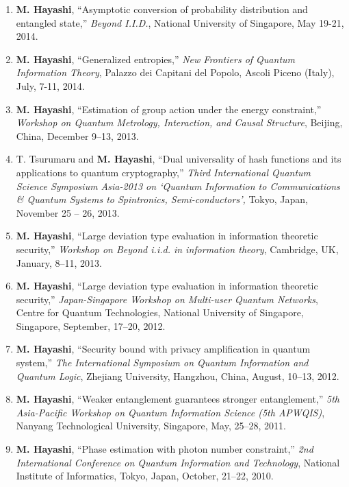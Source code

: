 \documentclass[a4paper,12pt,oneside]{article}
\begin{document}
\begin{enumerate}
\item 
\textbf{M. Hayashi}, 
``Asymptotic conversion of probability distribution and entangled state,'' {\em Beyond I.I.D.}, National University of Singapore, May 19-21, 2014.

\item 
\textbf{M. Hayashi}, 
``Generalized entropies,''
{\em New Frontiers of Quantum Information Theory}, 
Palazzo dei Capitani del Popolo, Ascoli Piceno (Italy),  July, 7-11, 2014.


\item 
\textbf{M. Hayashi}, 
``Estimation of group action under the energy constraint,''
{\em Workshop on Quantum Metrology, Interaction, and Causal Structure},
Beijing, China, December 9--13, 2013. 

\item 
T. Tsurumaru and \textbf{M. Hayashi}, 
``Dual universality of hash functions and its applications to quantum
cryptography,''
{\em Third International Quantum Science Symposium Asia-2013
on `Quantum Information to Communications \& Quantum Systems to Spintronics, Semi-conductors',}
Tokyo, Japan, November 25 -- 26, 2013.

\item 
\textbf{M. Hayashi}, 
``Large deviation type evaluation in information theoretic security,''
{\em Workshop on Beyond i.i.d. in information theory},
Cambridge, UK, January, 8--11, 2013.

\item 
\textbf{M. Hayashi}, 
``Large deviation type evaluation in information theoretic security,'' 
{\em Japan-Singapore Workshop on Multi-user Quantum Networks}, 
Centre for Quantum Technologies, National University of Singapore, Singapore, September, 17--20, 2012.


\item 
\textbf{M. Hayashi}, 
``Security bound with privacy amplification in quantum system,'' 
{\em The International Symposium on Quantum Information and Quantum Logic}, 
Zhejiang University, Hangzhou, China, August, 10--13, 2012.


\item 
\textbf{M. Hayashi}, 
``Weaker entanglement guarantees stronger entanglement,'' 
{\em 5th Asia-Pacific Workshop on Quantum Information Science (5th APWQIS)}, 
Nanyang Technological University, Singapore, May, 25--28, 2011.

\item 
\textbf{M. Hayashi}, 
``Phase estimation with photon number constraint,'' 
{\em 2nd International Conference on Quantum Information and Technology}, 
National Institute of Informatics, Tokyo, Japan, October, 21--22, 2010.


\end{enumerate}
\end{document}
